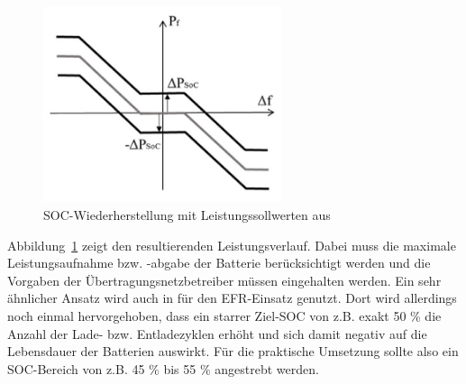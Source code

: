 \begin{figure}[h!]
    \centering
    \includegraphics[width=7cm]{Abbildungen/DroopErweitert.png}
    \caption{SOC-Wiederherstellung mit Leistungssollwerten aus \parencite[]{noauthor_soc_nodate}}\label{Droopplus}
\end{figure}

Abbildung~\ref{Droopplus} zeigt den resultierenden Leistungsverlauf.
Dabei muss die maximale Leistungsaufnahme bzw. -abgabe der Batterie berücksichtigt werden und die Vorgaben der
Übertragungsnetzbetreiber müssen eingehalten werden.
Ein sehr ähnlicher Ansatz wird auch in \parencite[]{mantar_gundogdu_battery_2018} für den EFR-Einsatz genutzt.
Dort wird allerdings noch einmal hervorgehoben, dass ein starrer Ziel-SOC von z.B. exakt 50 \% die 
Anzahl der Lade- bzw. Entladezyklen erhöht und sich damit negativ auf die Lebensdauer der Batterien auswirkt.
Für die praktische Umsetzung sollte also ein SOC-Bereich von z.B. 45 \% bis 55 \% angestrebt werden.